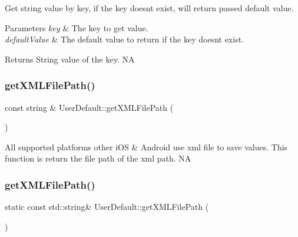 Get string value by key, if the key doesn\textquotesingle{}t exist, will return passed default value. 
\begin{DoxyParams}{Parameters}
{\em key} & The key to get value. \\
\hline
{\em default\+Value} & The default value to return if the key doesn\textquotesingle{}t exist. \\
\hline
\end{DoxyParams}
\begin{DoxyReturn}{Returns}
String value of the key.  NA 
\end{DoxyReturn}
\mbox{\label{classUserDefault_a17183b8c17bb55fad96e4a19429d0281}} 
\subsubsection{\texorpdfstring{get\+X\+M\+L\+File\+Path()}{getXMLFilePath()}\hspace{0.1cm}{\footnotesize\ttfamily [1/2]}}
{\footnotesize\ttfamily const string \& User\+Default\+::get\+X\+M\+L\+File\+Path (\begin{DoxyParamCaption}{ }\end{DoxyParamCaption})\hspace{0.3cm}{\ttfamily [static]}}

All supported platforms other i\+OS \& Android use xml file to save values. This function is return the file path of the xml path.  NA \mbox{\label{classUserDefault_aa10452da394dc5e043583781244eb70b}} 
\subsubsection{\texorpdfstring{get\+X\+M\+L\+File\+Path()}{getXMLFilePath()}\hspace{0.1cm}{\footnotesize\ttfamily [2/2]}}
{\footnotesize\ttfamily static const std\+::string\& User\+Default\+::get\+X\+M\+L\+File\+Path (\begin{DoxyParamCaption}{ }\end{DoxyParamCaption})\hspace{0.3cm}{\ttfamily [static]}}

